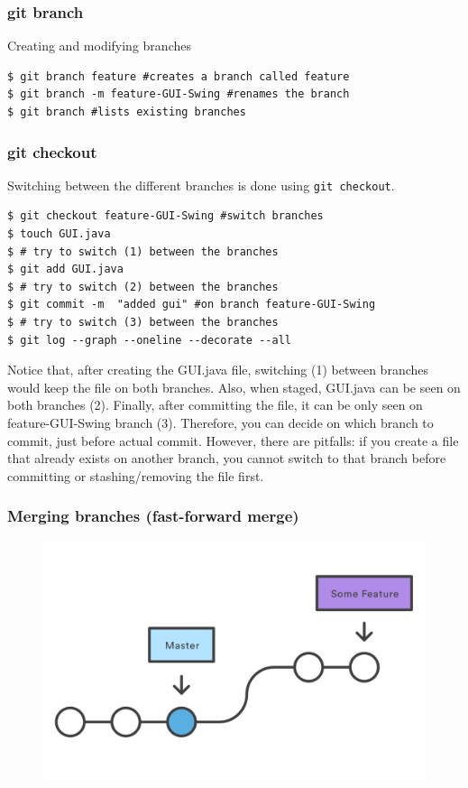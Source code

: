 \documentclass{beamer}
\begin{document}
\begin{frame}[fragile]
\frametitle{git branch}

Creating and modifying branches

\begin{lstlisting}
$ git branch feature #creates a branch called feature
$ git branch -m feature-GUI-Swing #renames the branch
$ git branch #lists existing branches
\end{lstlisting}
\end{frame}


\begin{frame}[fragile]
\frametitle{git checkout}

Switching between the different branches is done using \texttt{git
  checkout}.

\begin{lstlisting}
$ git checkout feature-GUI-Swing #switch branches
$ touch GUI.java 
$ # try to switch (1) between the branches
$ git add GUI.java
$ # try to switch (2) between the branches
$ git commit -m  "added gui" #on branch feature-GUI-Swing
$ # try to switch (3) between the branches
$ git log --graph --oneline --decorate --all
\end{lstlisting}

Notice that, after creating the GUI.java file,
switching (1) between branches would keep the file on both branches.
Also, when staged, GUI.java can be seen on both branches (2). Finally,
after committing the file, it can be only seen 
on feature-GUI-Swing branch (3). Therefore, you can decide on which
branch to commit, just before actual commit. However, there are
pitfalls: if you create a file that already exists on another branch,
you cannot switch to that branch before committing or
stashing/removing the file first.

\end{frame}


\begin{frame}
\frametitle{Merging branches (fast-forward merge)}

\begin{figure}
\includegraphics[scale=0.8]{figures/f13.png}
\end{figure}

\end{frame}
\end{document}
